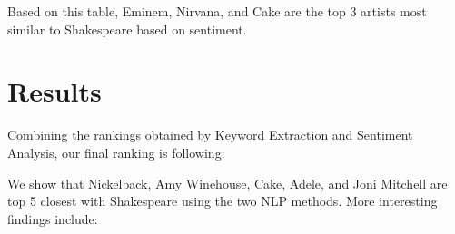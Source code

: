 \documentclass[10pt,a4paper]{article}
\begin{document}
Based on this table, Eminem, Nirvana, and Cake are the top 3 artists most similar to Shakespeare based on sentiment.

\section{Results}

Combining the rankings obtained by Keyword Extraction and Sentiment Analysis, our final ranking is following:

\begin{table}[ht]
\centering
{}
\caption{Ranked Top 10 Most Similar Music Artist to Shakespeare} 
\label{tab:overallranktable}
\end{table}


We show that Nickelback, Amy Winehouse, Cake, Adele, and Joni Mitchell are top 5 closest with Shakespeare using the two NLP methods. More interesting findings include:
\end{document}
